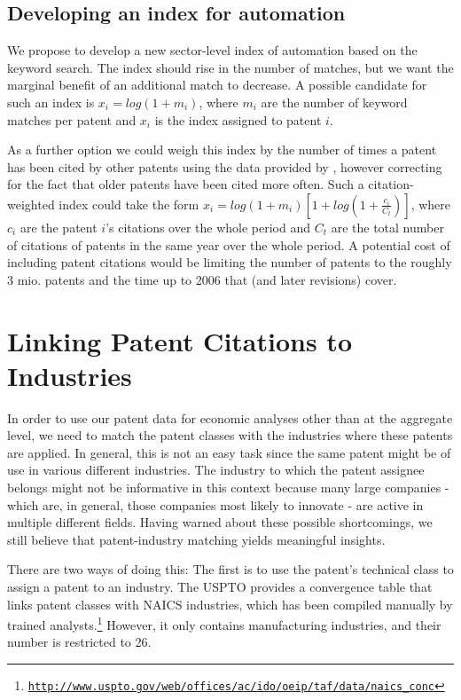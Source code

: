 \documentclass[11pt,a4paper,fleqn]{article}
\begin{document}
\subsection{Developing an index for automation}
We propose to develop a new sector-level index of automation based on the keyword search. The index should rise in the number of matches, but we want the marginal benefit of an additional match to decrease.  A possible candidate for such an index is $x_i = log(1+m_i)$, where $m_i$ are the number of keyword matches per patent and $x_i$ is the index assigned to patent $i$. 

As a further option we could weigh this index by the number of times a patent has been cited by other patents using the data provided by \cite{HJT2001}, however correcting for the fact that older patents have been cited more often. Such a citation-weighted index could take the form $x_i = log(1+m_i) [1+log(1+\frac{c_i}{C_t})]$, where $c_i$ are the patent $i$'s citations over the whole period and $C_t$ are the total number of citations of patents in the same year over the whole period. A potential cost of including patent citations would be limiting the number of patents to the roughly 3 mio. patents and the time up to 2006 that \cite{HJT2001} (and later revisions) cover. 


\section{Linking Patent Citations to Industries}
In order to use our patent data for economic analyses other than at the aggregate level, we need to match the patent classes with the industries where these patents are applied. In general, this is not an easy task since the same patent might be of use in various different industries. The industry to which the patent assignee belongs might not be informative in this context because many large companies - which are, in general, those companies most likely to innovate - are active in multiple different fields. Having warned about these possible shortcomings, we still believe that patent-industry matching yields meaningful insights.%

There are two ways of doing this: The first is to use the patent's technical class to assign a patent to an industry. The USPTO provides a convergence table that links patent classes with NAICS industries, which has been compiled manually by trained analysts.\footnote{\href{http://www.uspto.gov/web/offices/ac/ido/oeip/taf/data/naics_conc/2013/read_me.txt}{\texttt{http://www.uspto.gov/web/offices/ac/ido/oeip/taf/data/naics\_conc}}} However, it only contains manufacturing industries, and their number is restricted to 26. 
\end{document}
